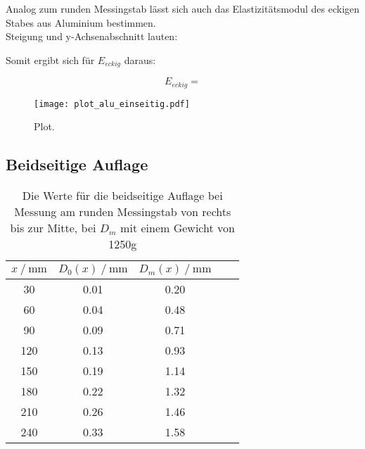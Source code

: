 Analog zum runden Messingstab lässt sich auch das Elastizitätsmodul des eckigen Stabes aus Aluminium bestimmen.\\
Steigung und y-Achsenabschnitt lauten:      %

Somit ergibt sich für $E_{eckig}$ daraus:

\begin{equation}
  E_{eckig} =             %
\end{equation}


\begin{figure}
  \centering
  \texttt{[image: plot\_alu\_einseitig.pdf]}
  \caption{Plot.}
  \label{fig:plot_alu_einseitig}
\end{figure}




\subsection{Beidseitige Auflage}
\label{sec:Beidseitige Auflage}



\begin{table}[H]
  \centering
  \caption{Die Werte für die beidseitige Auflage bei Messung am runden Messingstab von rechts bis zur Mitte, bei $D_m$ mit 
  einem Gewicht von 1250g}
  \begin{tabular}{ccccc}
    \toprule
    {$x \mathbin{/} \unit{\milli\metre}$} &
    {$D_0(x) \mathbin{/} \unit{\milli\metre}$} &
    {$D_m(x) \mathbin{/} \unit{\milli\metre}$} \\
    \midrule
    30 & 0.01 & 0.20  \\  
    60 & 0.04 & 0.48 \\
    90 & 0.09 & 0.71 \\
    120 & 0.13 & 0.93 \\
    150 & 0.19 & 1.14 \\
    180 & 0.22 & 1.32 \\
    210 & 0.26  & 1.46 \\
    240 & 0.33 & 1.58 \\
    
    \bottomrule
  \end{tabular}
  \label{tab:Tabelle3}
\end{table}



